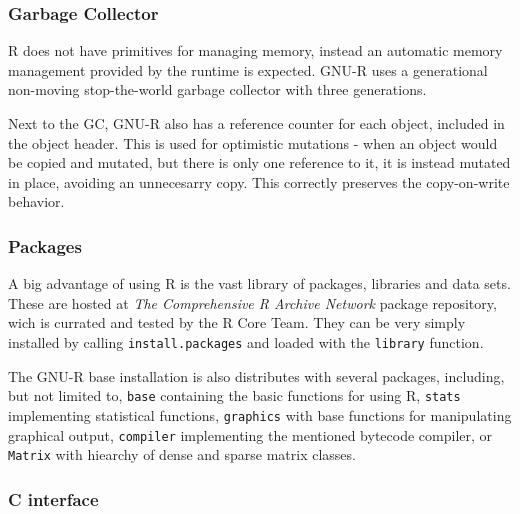 

\subsubsection*{Garbage Collector}
R does not have primitives for managing memory, instead an automatic memory management provided by the runtime is expected. GNU-R uses a generational non-moving stop-the-world garbage collector with three generations\cite{r-gc-notes}.

Next to the GC, GNU-R also has a reference counter for each object, included in the object header. This is used for optimistic mutations - when an object would be copied and mutated, but there is only one reference to it, it is instead mutated in place, avoiding an unnecesarry copy. This correctly preserves the copy-on-write behavior.

\subsubsection*{Packages}

A big advantage of using R is the vast library of packages, libraries and data sets. These are hosted at \textit{The Comprehensive R Archive Network}\cite{cran} package repository, wich is currated and tested by the R Core Team. They can be very simply installed by calling \texttt{install.packages} and loaded with the \texttt{library} function.

The GNU-R base installation is also distributes with several packages, including, but not limited to, \texttt{base} containing the basic functions for using R, \texttt{stats} implementing statistical functions, \texttt{graphics} with base functions for manipulating graphical output, \texttt{compiler} implementing the mentioned bytecode compiler, or \texttt{Matrix} with hiearchy of dense and sparse matrix classes.

\subsubsection*{C interface}


